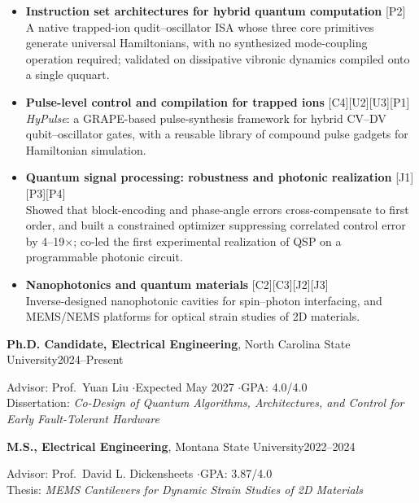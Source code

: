 \documentclass[10.5pt,letterpaper]{article}
\newcommand{\cvsec}[1]{%
  \par\needspace{4\baselineskip}\vspace{11pt}%
  \noindent\makebox[0pt][r]{%
    \smash{\parbox[t]{1.45in}{\raggedright\footnotesize\bfseries\MakeUppercase{#1}}}%
    \hspace{0.30in}}%
  \ignorespaces}
\newcommand{\entry}[2]{#1\hfill #2\par}
\begin{document}
\begin{itemize}
  \item \textbf{Instruction set architectures for hybrid quantum computation}
  [P2]\\
  A native trapped-ion qudit--oscillator ISA whose three core primitives generate
  universal Hamiltonians, with no synthesized mode-coupling operation required; validated
  on dissipative vibronic dynamics compiled onto a single ququart.

  \item \textbf{Pulse-level control and compilation for trapped ions}
  [C4][U2][U3][P1]\\
  \textit{HyPulse}: a GRAPE-based pulse-synthesis framework for hybrid CV--DV
  qubit--oscillator gates, with a reusable library of compound pulse gadgets for
  Hamiltonian simulation.

  \item \textbf{Quantum signal processing: robustness and photonic realization}
  [J1][P3][P4]\\
  Showed that block-encoding and phase-angle errors cross-compensate to first order, and
  built a constrained optimizer suppressing correlated control error by 4--19$\times$;
  co-led the first experimental realization of QSP on a programmable photonic circuit.

  \item \textbf{Nanophotonics and quantum materials}
  [C2][C3][J2][J3]\\
  Inverse-designed nanophotonic cavities for spin--photon interfacing, and MEMS/NEMS
  platforms for optical strain studies of 2D materials.
\end{itemize}

\cvsec{Education}
\entry{\textbf{Ph.D. Candidate, Electrical Engineering}, North Carolina State University}{2024--Present}
Advisor: Prof.\ Yuan Liu \quad$\cdot$\quad Expected May 2027 \quad$\cdot$\quad GPA: 4.0/4.0\\
Dissertation: \emph{Co-Design of Quantum Algorithms, Architectures, and Control for
Early Fault-Tolerant Hardware}

\vspace{5pt}
\entry{\textbf{M.S., Electrical Engineering}, Montana State University}{2022--2024}
Advisor: Prof.\ David L. Dickensheets \quad$\cdot$\quad GPA: 3.87/4.0\\
Thesis: \emph{MEMS Cantilevers for Dynamic Strain Studies of 2D Materials}
\end{document}
